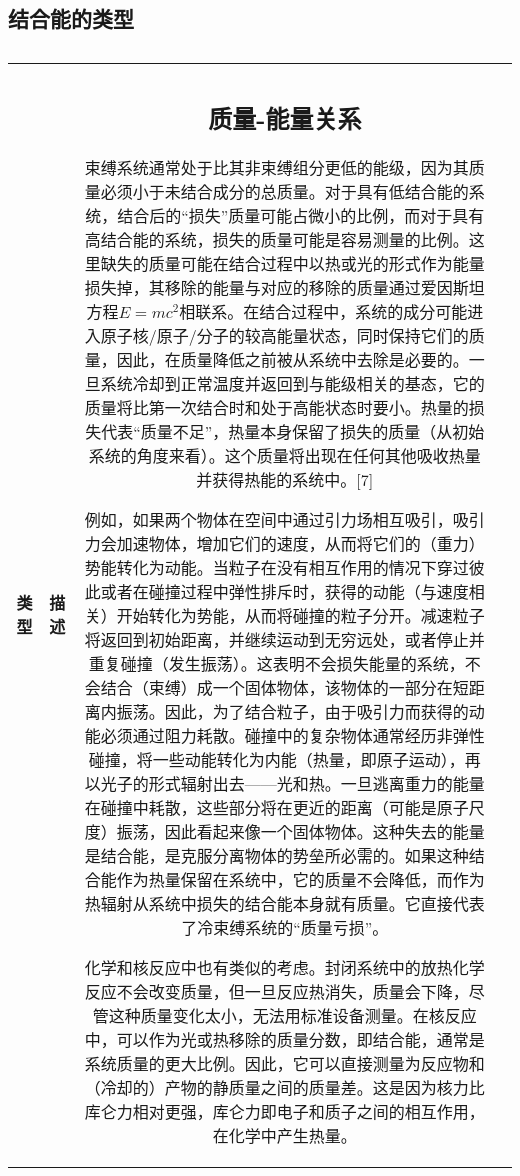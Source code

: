 \subsection{结合能的类型}
\begin{table}[ht]
\centering
\caption\label{JHNL}
\begin{tabular}{|c|c|c|c}
\hline
\textbf{类型} & \textbf{描述} & 







\subsection{质量-能量关系}
束缚系统通常处于比其非束缚组分更低的能级，因为其质量必须小于未结合成分的总质量。对于具有低结合能的系统，结合后的“损失”质量可能占微小的比例，而对于具有高结合能的系统，损失的质量可能是容易测量的比例。这里缺失的质量可能在结合过程中以热或光的形式作为能量损失掉，其移除的能量与对应的移除的质量通过爱因斯坦方程$E = mc^2$相联系。在结合过程中，系统的成分可能进入原子核/原子/分子的较高能量状态，同时保持它们的质量，因此，在质量降低之前被从系统中去除是必要的。一旦系统冷却到正常温度并返回到与能级相关的基态，它的质量将比第一次结合时和处于高能状态时要小。热量的损失代表“质量不足”，热量本身保留了损失的质量（从初始系统的角度来看）。这个质量将出现在任何其他吸收热量并获得热能的系统中。[7]

例如，如果两个物体在空间中通过引力场相互吸引，吸引力会加速物体，增加它们的速度，从而将它们的（重力）势能转化为动能。当粒子在没有相互作用的情况下穿过彼此或者在碰撞过程中弹性排斥时，获得的动能（与速度相关）开始转化为势能，从而将碰撞的粒子分开。减速粒子将返回到初始距离，并继续运动到无穷远处，或者停止并重复碰撞（发生振荡）。这表明不会损失能量的系统，不会结合（束缚）成一个固体物体，该物体的一部分在短距离内振荡。因此，为了结合粒子，由于吸引力而获得的动能必须通过阻力耗散。碰撞中的复杂物体通常经历非弹性碰撞，将一些动能转化为内能（热量，即原子运动），再以光子的形式辐射出去——光和热。一旦逃离重力的能量在碰撞中耗散，这些部分将在更近的距离（可能是原子尺度）振荡，因此看起来像一个固体物体。这种失去的能量是结合能，是克服分离物体的势垒所必需的。如果这种结合能作为热量保留在系统中，它的质量不会降低，而作为热辐射从系统中损失的结合能本身就有质量。它直接代表了冷束缚系统的“质量亏损”。

化学和核反应中也有类似的考虑。封闭系统中的放热化学反应不会改变质量，但一旦反应热消失，质量会下降，尽管这种质量变化太小，无法用标准设备测量。在核反应中，可以作为光或热移除的质量分数，即结合能，通常是系统质量的更大比例。因此，它可以直接测量为反应物和（冷却的）产物的静质量之间的质量差。这是因为核力比库仑力相对更强，库仑力即电子和质子之间的相互作用，在化学中产生热量。


\end{tabular}
\end{table}
